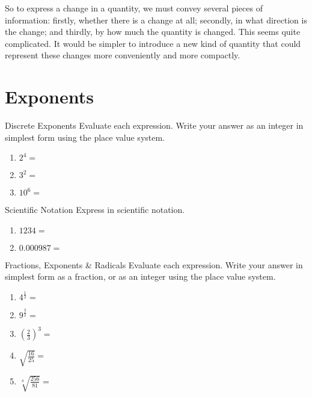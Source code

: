 \documentclass[12pt,a4paper]{article}
\begin{document}
So to express a change in a quantity, we must convey several pieces of
information: firstly, whether there is a change at all; secondly, in what
direction is the change; and thirdly, by how much the quantity is changed. This
seems quite complicated. It would be simpler to introduce a new kind of
quantity that could represent these changes more conveniently and more
compactly.

\section{Exponents}

\begin{problem}{Discrete Exponents}
 Evaluate each expression. Write your answer as an integer in simplest form
 using the place value system.

 \begin{enumerate}[\hspace{.5cm}a.]
  \item $2^4=$ \hfill\blankC
  \item $3^2=$ \hfill\blankC
  \item $10^6=$ \hfill\blankF
 \end{enumerate}
\end{problem}

\begin{problem}{Scientific Notation}
 Express in scientific notation.

 \begin{enumerate}[\hspace{.5cm}a.]
  \item $1234=$ \hfill\blankF
  \item $0.000987=$ \hfill\blankF
 \end{enumerate}
\end{problem}

\begin{problem}{Fractions, Exponents \& Radicals}
 Evaluate each expression. Write your answer in simplest form as a fraction, or
 as an integer using the place value system.

 \begin{enumerate}[\hspace{.5cm}a.]
  \item $4^{\frac{1}{2}}=$ \hfill\blankC
  \item $9^{\frac{3}{2}}=$ \hfill\blankC
  \item ${\left(\frac{2}{3}\right)}^3=$ \hfill\blankC
  \item $\sqrt{\frac{16}{25}}=$ \hfill\blankC
  \item $\sqrt[4]{\frac{256}{81}}=$ \hfill\blankC
 \end{enumerate}
\end{problem}
\end{document}
